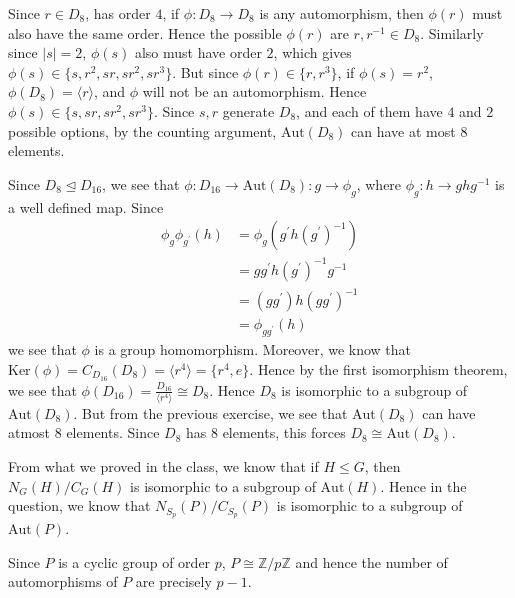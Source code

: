 \documentclass[12pt]{exam}
\theoremstyle{plain} %
\theoremstyle{definition} %
\theoremstyle{remark} %
\begin{document}
\begin{questions}
  \question
  \begin{solution}
    Since $r \in D_8$, has order $4$, if $\phi: D_8 \to D_8$ is any
    automorphism, then $\phi(r)$ must also have the same order. Hence
    the possible $\phi(r)$ are $r, r^{-1} \in D_8$. Similarly  since
    $|s| = 2$, $\phi(s)$ also  must have order $2$, which gives
    $\phi(s) \in \{ s, r^2, sr, sr^2, sr^3\}$. But since $\phi(r) \in
    \{ r , r^3  \}$, if $\phi(s) = r^2$, $\phi(D_8) = \langle  r
    \rangle $, and $\phi$ will not be an automorphism. Hence $\phi(s)
    \in \{  s, sr, sr^2, sr^3 \}$. Since $s, r$ generate $D_8$, and
    each of them have $4$ and $2$ possible options, by the counting
    argument, $\textrm{Aut}(D_8)$ can have at most 8 elements.
  \end{solution}

  \question
  \begin{solution}
    Since $D_8 \trianglelefteq D_{16}$, we see that $\phi: D_{16} \to
    \textrm{Aut}(D_8): g \to \phi_g$, where $\phi_g: h \to ghg^{-1}$
    is a well defined map. Since
    \begin{align*}
      \phi_g \phi_{g^\prime}(h) & = \phi_g(g^\prime h(g^\prime)^{-1}) \\
      & = gg^\prime h (g^\prime)^{-1} g^{-1} \\
      & = (gg^\prime) h (gg^\prime)^{-1} \\
      & = \phi_{gg^\prime}(h)
    \end{align*}
    we see that $\phi$ is a group homomorphism. Moreover, we know
    that $\textrm{Ker}(\phi) = C_{D_{16}}(D_8) = \langle r^4 \rangle =
    \{r^4, e\}$. Hence by
    the first isomorphism theorem, we see that $\phi(D_{16}) =
    \frac{D_{16}}{\langle r^4 \rangle} \cong D_8$. Hence $D_8$ is
    isomorphic to a subgroup of $\textrm{Aut}(D_8)$. But from the
    previous exercise, we see that $  \textrm{Aut}(D_8)$ can have
    atmost $8$ elements. Since $D_8$ has $8$ elements, this forces
    $D_8 \cong \textrm{Aut}(D_8)$.
  \end{solution}

  \question
  \begin{solution}
    From what we proved in the class, we know that if $H \leqslant
    G$, then $N_G(H)/C_G(H)$ is isomorphic to a subgroup of
    $\textrm{Aut}(H)$. Hence in the question, we know that
    $N_{S_p}(P)/C_{S_p}(P)$ is isomorphic to a subgroup of $\textrm{Aut}(P)$.

    Since $P$ is a cyclic group of order $p$, $P \cong
    \mathbb{Z}/p\mathbb{Z}$ and hence the number of automorphisms of
    $P$ are precisely $p-1$.


\end{solution}
\end{questions}
\end{document}
